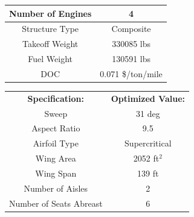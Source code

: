 \documentclass{article}
\begin{document}
\begin{table}[ht]
\begin{tabular}{|c|c|}
                \rowcolor[HTML]{C0C0C0}
                Number of Engines                  & 4                                   \\ \hline
                \rowcolor[HTML]{FFFFFF}
                Structure Type                     & Composite                           \\ \hline
                \rowcolor[HTML]{C0C0C0}
                Takeoff Weight                     & 330085 lbs                          \\ \hline
                \rowcolor[HTML]{FFFFFF}
                Fuel Weight                        & 130591 lbs                           \\ \hline
                \rowcolor[HTML]{C0C0C0}
                DOC                                & 0.071 \$/ton/mile                   \\ \hline
            \end{tabular}
            \quad
            \begin{tabular}{|c|c|}
                \hline
                \rowcolor[HTML]{DAE8FC}
                \multicolumn{2}{|c|}{\cellcolor[HTML]{DAE8FC}\textbf{One-stop Aircraft}} \\ \hline
                \textbf{Specification:}            & \textbf{Optimized Value:}           \\ \hline
                Sweep                              & 31 deg                              \\ \hline
                \rowcolor[HTML]{C0C0C0}
                Aspect Ratio                       & 9.5                                 \\ \hline
                \rowcolor[HTML]{FFFFFF}
                Airfoil Type                       & Supercritical                       \\ \hline
                \rowcolor[HTML]{C0C0C0}
                Wing Area                          & 2052 ft$^2$                             \\ \hline
                \rowcolor[HTML]{FFFFFF}
                Wing Span                          & 139 ft                              \\ \hline
                \rowcolor[HTML]{C0C0C0}
                Number of Aisles                   & 2                                   \\ \hline
                \rowcolor[HTML]{FFFFFF}
                Number of Seats Abreast            & 6                                   \\ \hline

\end{tabular}
\end{table}
\end{document}
